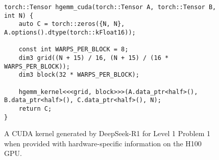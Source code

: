 \begin{figure}
\begin{lstlisting}
torch::Tensor hgemm_cuda(torch::Tensor A, torch::Tensor B, int N) {
    auto C = torch::zeros({N, N}, A.options().dtype(torch::kFloat16));
    
    const int WARPS_PER_BLOCK = 8;
    dim3 grid((N + 15) / 16, (N + 15) / (16 * WARPS_PER_BLOCK));
    dim3 block(32 * WARPS_PER_BLOCK);
    
    hgemm_kernel<<<grid, block>>>(A.data_ptr<half>(), B.data_ptr<half>(), C.data_ptr<half>(), N);
    return C;
}
\end{lstlisting}
\caption{A CUDA kernel generated by DeepSeek-R1 for Level 1 Problem 1 when provided with hardware-specific information on the H100 GPU.}
\label{fig:example_r1_generated_kernel_hw}
\end{figure}
\FloatBarrier